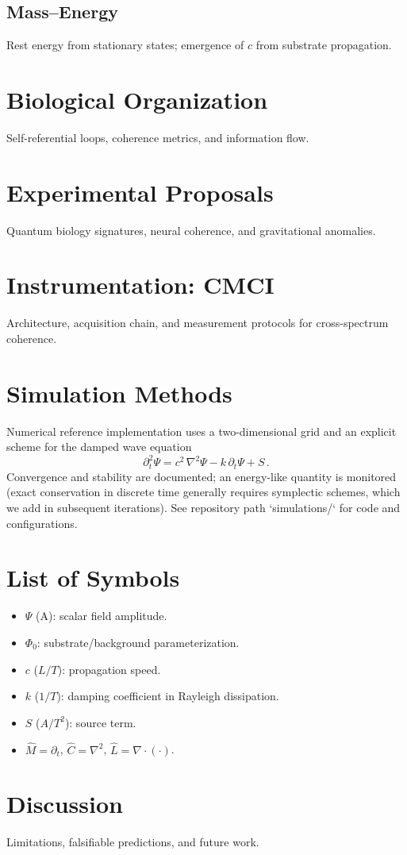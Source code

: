 \documentclass[12pt]{article}
\begin{document}
\subsection{Mass--Energy}
Rest energy from stationary states; emergence of $c$ from substrate propagation.

\section{Biological Organization}
Self-referential loops, coherence metrics, and information flow.

\section{Experimental Proposals}
Quantum biology signatures, neural coherence, and gravitational anomalies.

\section{Instrumentation: CMCI}
Architecture, acquisition chain, and measurement protocols for cross-spectrum coherence.

\section{Simulation Methods}
Numerical reference implementation uses a two-dimensional grid and an explicit scheme for the damped wave equation
\begin{equation}
  \partial_t^2 \Psi = c^2\,\nabla^2\Psi - k\,\partial_t\Psi + S\, .
\end{equation}
Convergence and stability are documented; an energy-like quantity is monitored (exact conservation in discrete time generally requires symplectic schemes, which we add in subsequent iterations). See repository path `simulations/` for code and configurations.

\section{List of Symbols}
\begin{itemize}
  \item $\Psi$ (A): scalar field amplitude.
  \item $\Phi_0$: substrate/background parameterization.
  \item $c$ ($L/T$): propagation speed.
  \item $k$ ($1/T$): damping coefficient in Rayleigh dissipation.
  \item $S$ ($A/T^2$): source term.
  \item $\hat M=\partial_t$, $\hat C=\nabla^2$, $\hat L=\nabla\cdot(\cdot)$.
\end{itemize}

\section{Discussion}
Limitations, falsifiable predictions, and future work.

\printbibliography
\end{document}
